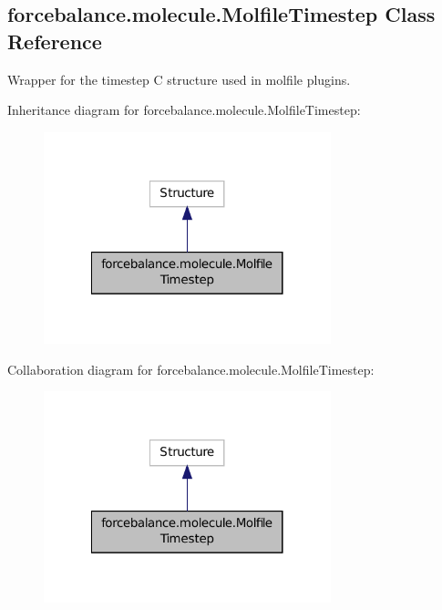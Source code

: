 \hypertarget{classforcebalance_1_1molecule_1_1MolfileTimestep}{\subsection{forcebalance.\-molecule.\-Molfile\-Timestep Class Reference}
\label{classforcebalance_1_1molecule_1_1MolfileTimestep}
}


Wrapper for the timestep C structure used in molfile plugins.  




Inheritance diagram for forcebalance.\-molecule.\-Molfile\-Timestep\-:
\nopagebreak
\begin{figure}[H]
\begin{center}
\leavevmode
\includegraphics[width=236pt]{classforcebalance_1_1molecule_1_1MolfileTimestep__inherit__graph}
\end{center}
\end{figure}


Collaboration diagram for forcebalance.\-molecule.\-Molfile\-Timestep\-:
\nopagebreak
\begin{figure}[H]
\begin{center}
\leavevmode
\includegraphics[width=236pt]{classforcebalance_1_1molecule_1_1MolfileTimestep__coll__graph}
\end{center}
\end{figure}


